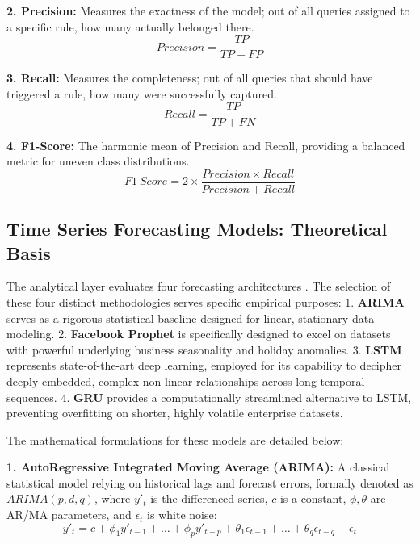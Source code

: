 \documentclass[conference]{IEEEtran}
\begin{document}
\textbf{2. Precision:} Measures the exactness of the model; out of all queries assigned to a specific rule, how many actually belonged there.
\begin{equation}
Precision = \frac{TP}{TP + FP}
\end{equation}

\textbf{3. Recall:} Measures the completeness; out of all queries that should have triggered a rule, how many were successfully captured.
\begin{equation}
Recall = \frac{TP}{TP + FN}
\end{equation}

\textbf{4. F1-Score:} The harmonic mean of Precision and Recall, providing a balanced metric for uneven class distributions.
\begin{equation}
F1\ Score = 2 \times \frac{Precision \times Recall}{Precision + Recall}
\end{equation}

\subsection{Time Series Forecasting Models: Theoretical Basis}
The analytical layer evaluates four forecasting architectures \cite{sunendar2025comparison}. The selection of these four distinct methodologies serves specific empirical purposes:
1. \textbf{ARIMA} serves as a rigorous statistical baseline designed for linear, stationary data modeling.
2. \textbf{Facebook Prophet} is specifically designed to excel on datasets with powerful underlying business seasonality and holiday anomalies.
3. \textbf{LSTM} represents state-of-the-art deep learning, employed for its capability to decipher deeply embedded, complex non-linear relationships across long temporal sequences.
4. \textbf{GRU} provides a computationally streamlined alternative to LSTM, preventing overfitting on shorter, highly volatile enterprise datasets.

The mathematical formulations for these models are detailed below:

\textbf{1. AutoRegressive Integrated Moving Average (ARIMA):}
A classical statistical model relying on historical lags and forecast errors, formally denoted as $ARIMA(p, d, q)$, where $y'_t$ is the differenced series, $c$ is a constant, $\phi, \theta$ are AR/MA parameters, and $\epsilon_t$ is white noise:
\begin{equation}
y'_t = c + \phi_1 y'_{t-1} + \dots + \phi_p y'_{t-p} + \theta_1 \epsilon_{t-1} + \dots + \theta_q \epsilon_{t-q} + \epsilon_t
\end{equation}
\end{document}

